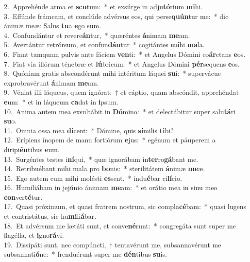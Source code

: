 {2.~}Apprehénde arma et \textbf{scu}tum:~* et exsúrge in adju\textbf{tó}rium \textbf{mi}hi.\\
{3.~}Effúnde frámeam, et conclúde advérsus eos, qui perse\textbf{quún}tur me:~* dic ánimæ meæ: Salus \textbf{tu}a \textbf{e}go sum.\\
{4.~}Confundántur et revere\textbf{án}tur,~* quæréntes \textbf{á}nimam \textbf{me}am.\\
{5.~}Avertántur retrórsum, et confun\textbf{dán}tur~* cogitántes \textbf{mi}hi \textbf{ma}la.\\
{6.~}Fiant tamquam pulvis ante fáciem \textbf{ven}ti:~* et Angelus Dómini co\textbf{ár}ctans \textbf{e}os.\\
{7.~}Fiat via illórum ténebræ et \textbf{lú}bricum:~* et Angelus Dómini \textbf{pér}sequens \textbf{e}os.\\
{8.~}Quóniam gratis abscondérunt mihi intéritum láquei \textbf{su}i:~* supervácue exprobravérunt \textbf{á}nimam \textbf{me}am.\\
{9.~}Véniat illi láqueus, quem ignórat:~† et cáptio, quam abscóndit, apprehéndat \textbf{e}um:~* et in láqueum \textbf{ca}dat in \textbf{i}psum.\\
{10.~}Anima autem mea exsultábit in \textbf{Dó}mino:~* et delectábitur super salu\textbf{tá}ri \textbf{su}o.\\
{11.~}Omnia ossa mea \textbf{di}cent:~* Dómine, quis \textbf{sí}milis \textbf{ti}bi?\\
{12.~}Erípiens ínopem de manu fortiórum \textbf{e}jus:~* egénum et páuperem a diripi\textbf{én}tibus \textbf{e}um.\\
{13.~}Surgéntes testes i\textbf{ní}qui,~* quæ ignorábam in\textbf{ter}ro\textbf{gá}bant me.\\
{14.~}Retribuébant mihi mala pro \textbf{bo}nis:~* sterilitátem \textbf{á}nimæ \textbf{me}æ.\\
{15.~}Ego autem cum mihi molésti \textbf{es}sent,~* indu\textbf{é}bar ci\textbf{lí}cio.\\
{16.~}Humiliábam in jejúnio ánimam \textbf{me}am:~* et orátio mea in sinu meo \textbf{con}ver\textbf{té}tur.\\
{17.~}Quasi próximum, et quasi fratrem nostrum, sic compla\textbf{cé}bam:~* quasi lugens et contristátus, sic hu\textbf{mi}li\textbf{á}bar.\\
{18.~}Et advérsum me lætáti sunt, et conve\textbf{né}runt:~* congregáta sunt super me flagélla, et \textbf{i}gno\textbf{rá}vi.\\
{19.~}Dissipáti sunt, nec compúncti,~† tentavérunt me, subsannavérunt me subsannati\textbf{ó}ne:~* frenduérunt super me \textbf{dén}tibus \textbf{su}is.\\
